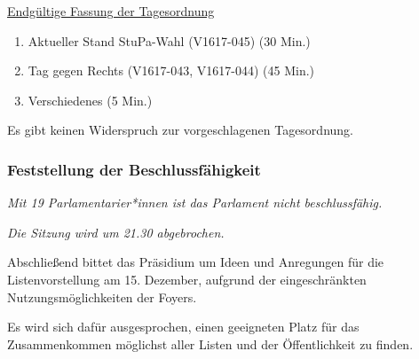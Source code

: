 \documentclass[ngerman,headheight=70pt]{scrartcl}
\begin{document}
    \underline{Endgültige Fassung der Tagesordnung}
    \begin{enumerate}[label={\textbf{Top \theenumi}},leftmargin=*]
        \item Aktueller Stand StuPa-Wahl (V1617-045) (30 Min.)
        \item Tag gegen Rechts (V1617-043, V1617-044) (45 Min.)
        \item Verschiedenes (5 Min.)
    \end{enumerate}

    Es gibt keinen Widerspruch zur vorgeschlagenen Tagesordnung.

    \subsubsection{Feststellung der Beschlussfähigkeit}

    \textit{Mit 19 Parlamentarier*innen ist das Parlament nicht beschlussfähig.}

    \textit{Die Sitzung wird um 21.30 abgebrochen.}

    Abschließend bittet das Präsidium um Ideen und Anregungen für die
    Listenvorstellung am 15. Dezember, aufgrund der eingeschränkten
    Nutzungsmöglichkeiten der Foyers.

    Es wird sich dafür ausgesprochen, einen geeigneten Platz für das
    Zusammenkommen möglichst aller Listen und der Öffentlichkeit zu finden.
\end{document}
